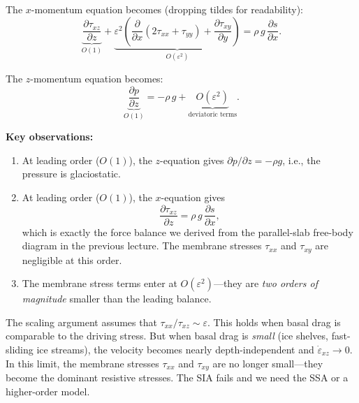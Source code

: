 \documentclass[11pt]{article}
\begin{document}
\medskip
\noindent The $x$-momentum equation becomes (dropping tildes for readability):
\begin{equation}
  \underbrace{\frac{\partial \tau_{xz}}{\partial z}}_{\displaystyle O(1)}
  + \underbrace{\varepsilon^2\left(\frac{\partial}{\partial x}\left(2\tau_{xx} + \tau_{yy}\right) + \frac{\partial \tau_{xy}}{\partial y}\right)}_{\displaystyle O(\varepsilon^2)}
  = \rho\,g\,\frac{\partial s}{\partial x}.
  \label{eq:x_momentum_scaled}
\end{equation}

\noindent The $z$-momentum equation becomes:
\begin{equation}
  \underbrace{\frac{\partial p}{\partial z}}_{\displaystyle O(1)}
  = -\rho\,g + \underbrace{O(\varepsilon^2)}_{\text{deviatoric terms}}.
  \label{eq:z_momentum_scaled}
\end{equation}


\medskip
\noindent\textbf{Key observations:}
\begin{enumerate}
  \item At leading order ($O(1)$), the $z$-equation gives $\partial p/\partial z = -\rho g$, i.e., the pressure is glaciostatic.
  \item At leading order ($O(1)$), the $x$-equation gives
  \begin{equation}
    \frac{\partial \tau_{xz}}{\partial z} = \rho\,g\,\frac{\partial s}{\partial x},
    \label{eq:sia_balance}
  \end{equation}
  which is exactly the force balance we derived from the parallel-slab free-body diagram in the previous lecture.  The membrane stresses $\tau_{xx}$ and $\tau_{xy}$ are negligible at this order.
  \item The membrane stress terms enter at $O(\varepsilon^2)$---they are \emph{two orders of magnitude} smaller than the leading balance.
\end{enumerate}

\begin{tcolorbox}[
  colback=orange!5,
  colframe=orange!60!black,
  title={\textbf{When does the scaling break down?}}
]
The scaling argument assumes that $\tau_{xx}/\tau_{xz} \sim \varepsilon$.  This holds when basal drag is comparable to the driving stress.  But when basal drag is \emph{small} (ice shelves, fast-sliding ice streams), the velocity becomes nearly depth-independent and $\dot{\varepsilon}_{xz} \to 0$.  In this limit, the membrane stresses $\tau_{xx}$ and $\tau_{xy}$ are no longer small---they become the dominant resistive stresses.  The SIA fails and we need the SSA or a higher-order model.
\end{tcolorbox}
\end{document}
